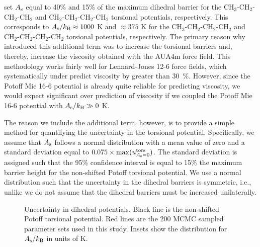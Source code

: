 \documentclass[preprint,review,12pt]{elsarticle}
\begin{document}
     set $A_{\rm s}$ equal to 40\% and 15\% of the maximum dihedral barrier for the CH$_3$-CH$_2$-CH$_2$-CH$_2$ and CH$_2$-CH$_2$-CH$_2$-CH$_2$ torsional potentials, respectively. This corresponds to $A_{\rm s}/k_{\rm B} \approx 1000$ K and $\approx 375$ K for the CH$_3$-CH$_2$-CH$_2$-CH$_2$ and CH$_2$-CH$_2$-CH$_2$-CH$_2$ torsional potentials, respectively. The primary reason why  introduced this additional term was to increase the torsional barriers and, thereby, increase the viscosity obtained with the AUA4m force field. This methodology works fairly well for Lennard-Jones 12-6 force fields, which systematically under predict viscosity by greater than 30~\%. However, since the Potoff Mie 16-6 potential is already quite reliable for predicting viscosity, we would expect significant over prediction of viscosity if we coupled the Potoff Mie 16-6 potential with $A_{\rm s}/k_{\rm B} \gg 0 $ K.

    The reason we include the additional term, however, is to provide a simple method for quantifying the uncertainty in the torsional potential. Specifically, we assume that $A_{\rm s}$ follows a normal distribution with a mean value of zero and a standard deviation equal to $0.075 \times \max(u^{\rm tors}_{A_{\rm s}=0})$. The standard deviation is assigned such that the 95\% confidence interval is equal to 15\% the maximum barrier height for the non-shifted Potoff torsional potential. We use a normal distribution such that the uncertainty in the dihedral barriers is symmetric, i.e., unlike  we do not assume that the dihedral barriers must be increased unilaterally.
    
    
	\begin{figure}[htb!]
		\centering
		\caption{Uncertainty in dihedral potentials. Black line is the non-shifted Potoff torsional potential. Red lines are the 200 MCMC sampled parameter sets used in this study. Insets show the distribution for $A_{\rm s}/k_{\rm B}$ in units of K.}
		\label{fig:dihedral_uncertainty}
	\end{figure}
	
\end{document}
